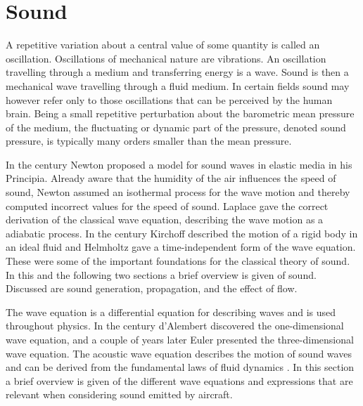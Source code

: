 \section{Sound}

A repetitive variation about a central value of some quantity is called an
oscillation. Oscillations of mechanical nature are vibrations. An
oscillation travelling through a medium and transferring energy is a wave. Sound
is then a mechanical wave travelling through a fluid medium.
In certain fields sound may however refer only to those oscillations that can be perceived by the human brain.
Being a small repetitive perturbation about the barometric
mean pressure of the medium, the fluctuating or dynamic part of the pressure,
denoted sound pressure, is typically many orders smaller than the mean
pressure.

In the  century Newton proposed a model for sound waves in elastic media
in his Principia. Already aware that the humidity of the air influences the
speed of sound, Newton assumed an isothermal process for the wave motion and
thereby computed incorrect values for the speed of sound. Laplace gave the
correct derivation of the classical wave equation, describing the wave motion as
a adiabatic process. In the  century Kirchoff described the motion of a
rigid body in an ideal fluid and Helmholtz gave a time-independent form of the
wave equation. These were some of the important foundations for the classical
theory of sound.
In this and the following two sections a brief overview is given of sound. Discussed are sound
generation, propagation, and the effect of flow.

The wave equation is a differential equation for describing waves and is used
throughout physics. In the  century d'Alembert discovered the
one-dimensional wave equation, and a couple of years later Euler presented the
three-dimensional wave equation. The acoustic wave equation describes the motion
of sound waves and can be derived from the fundamental laws of fluid dynamics \cite{Rienstra2017}.
In this section a brief overview is given of the different wave equations and
expressions that are relevant when considering sound emitted by aircraft.

